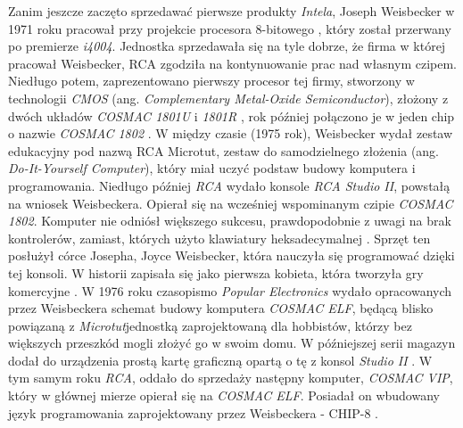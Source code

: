  Zanim jeszcze zaczęto sprzedawać pierwsze produkty \textit{Intela}, Joseph Weisbecker w 1971 roku pracował przy projekcie procesora 8-bitowego \cite{Edwards}, który został przerwany po premierze \textit{i4004}. Jednostka sprzedawała się na tyle dobrze, że firma w której pracował Weisbecker, RCA zgodziła na kontynuowanie prac nad własnym czipem. Niedługo potem, zaprezentowano pierwszy procesor tej firmy, stworzony w technologii \textit{CMOS} (ang. \textit{Complementary Metal-Oxide Semiconductor}), złożony z dwóch układów \textit{COSMAC 1801U} i \textit{1801R} \cite{Edwards}, rok później połączono je w jeden chip o nazwie \textit{COSMAC 1802} . W między czasie (1975 rok), Weisbecker wydał zestaw edukacyjny pod nazwą RCA Microtut, zestaw do samodzielnego złożenia (ang. \textit{Do-It-Yourself Computer}), który miał uczyć podstaw budowy komputera i programowania. Niedługo później \textit{RCA} wydało konsole \textit{RCA Studio II}, powstałą na wniosek Weisbeckera. Opierał się na wcześniej wspominanym czipie \textit{COSMAC 1802}. Komputer nie odniósł większego sukcesu, prawdopodobnie z uwagi na brak kontrolerów, zamiast, których użyto klawiatury heksadecymalnej \cite{Cowgod}. Sprzęt ten posłużył córce Josepha, Joyce Weisbecker, która nauczyła się programować dzięki tej konsoli. W historii zapisała się jako pierwsza kobieta, która tworzyła gry komercyjne \cite{Edwards}. W 1976 roku czasopismo \textit{Popular Electronics} wydało opracowanych przez Weisbeckera schemat budowy komputera \textit{COSMAC ELF}, będącą blisko powiązaną z \textit{Microtut}jednostką zaprojektowaną dla hobbistów, którzy bez większych przeszkód mogli złożyć go w swoim domu. W późniejszej serii magazyn dodał do urządzenia prostą kartę graficzną opartą o tę z konsol \textit{Studio II} \cite{Edwards}. W tym samym roku \textit{RCA}, oddało do sprzedaży następny komputer, \textit{COSMAC VIP}, który w głównej mierze opierał się na \textit{COSMAC ELF}. Posiadał on wbudowany język programowania zaprojektowany przez Weisbeckera - CHIP-8 \cite{Cowgod}.
 

